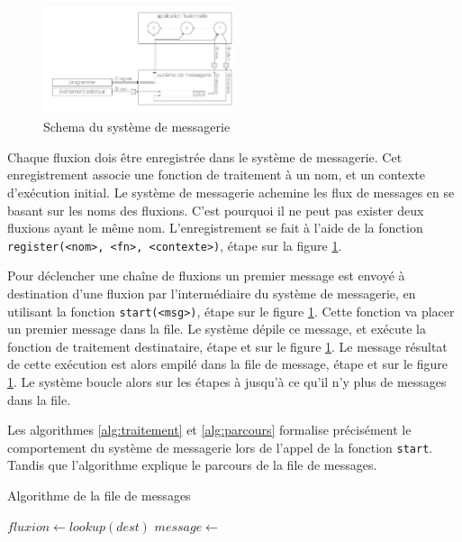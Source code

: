 \begin{figure}[h!]
  \includegraphics[width=0.5\textwidth]{schema-message.pdf}
  \caption{Schema du système de messagerie}
  \label{fig:messagerie}
\end{figure}

Chaque fluxion dois être enregistrée dans le système de messagerie.
Cet enregistrement associe une fonction de traitement à un nom, et un contexte d'exécution initial.
Le système de messagerie achemine les flux de messages en se basant sur les noms des fluxions.
C'est pourquoi il ne peut pas exister deux fluxions ayant le même nom.
L'enregistrement se fait à l'aide de la fonction \texttt{register(<nom>, <fn>, <contexte>)}, étape  sur la figure \ref{fig:messagerie}.

Pour déclencher une chaîne de fluxions un premier message est envoyé à destination d'une fluxion par l'intermédiaire du système de messagerie, en utilisant la fonction \texttt{start(<msg>)}, étape  sur le figure \ref{fig:messagerie}.
Cette fonction va placer un premier message dans la file.
Le système dépile ce message, et exécute la fonction de traitement destinataire, étape  et  sur le figure \ref{fig:messagerie}.
Le message résultat de cette exécution est alors empilé dans la file de message, étape  et  sur le figure \ref{fig:messagerie}.
Le système boucle alors sur les étapes  à  jusqu'à ce qu'il n'y plus de messages dans la file.

Les algorithmes \ref{alg:traitement} et \ref{alg:parcours} formalise précisément le comportement du système de messagerie lors de l'appel de la fonction \texttt{start}.
Tandis que l'algorithme explique le parcours de la file de messages.

\begin{algorithm}
\caption{Algorithme de la file de messages}
\label{alg:traitement}
\begin{algorithmic}
\State $fluxion \gets lookup(dest)$
\State $message \gets$  
\State {} 
\EndFor
\EndFunction
\end{algorithmic}
\end{algorithm}

